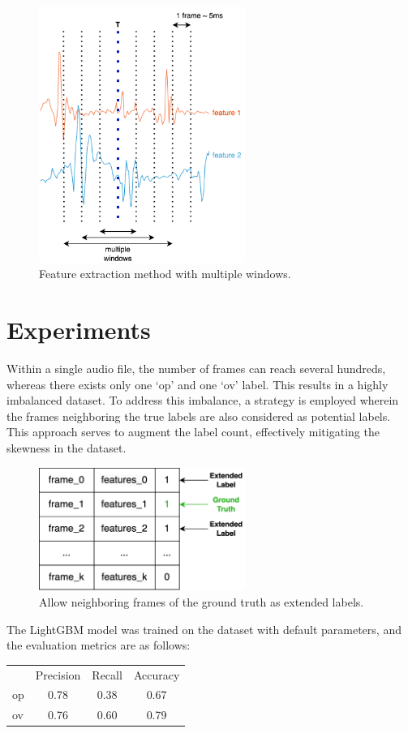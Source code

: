 \documentclass{article}
\begin{document}
\begin{figure}[!htb]
    \centering
    \includegraphics[width=0.6\textwidth]{img/features.png}
    \caption{Feature extraction method with multiple windows.}
\end{figure}
\section{Experiments}
Within a single audio file, the number of frames can reach several hundreds, whereas there exists only one `op' and one `ov' label. This results in a highly imbalanced dataset. To address this imbalance, a strategy is employed wherein the frames neighboring the true labels are also considered as potential labels. This approach serves to augment the label count, effectively mitigating the skewness in the dataset.
\begin{figure}[!htb]
    \centering
    \includegraphics[width=0.6\textwidth]{img/training.png}
    \caption{Allow neighboring frames of the ground truth as extended labels.}
\end{figure}
The LightGBM model was trained on the dataset with default parameters, and the evaluation metrics are as follows:
\begin{table}[h]
    \centering
    \begin{tabular}{l c c c}
        \midrule
           & Precision & Recall & Accuracy \\
        op & 0.78      & 0.38   & 0.67     \\
        ov & 0.76      & 0.60   & 0.79     \\
        \midrule
    \end{tabular}
\end{table}
\end{document}

